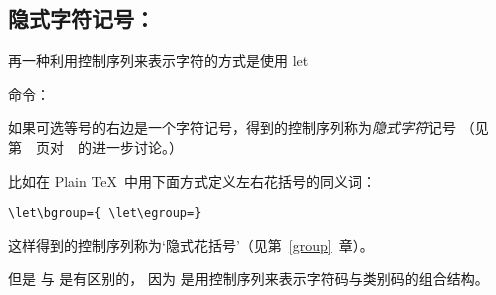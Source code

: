 \documentclass{book}
\begin{document}
\subsection{隐式字符记号：\protect{}}

再一种利用控制序列来表示字符的方式是使用 \cstoidx let\par{} 命令：
\begin{disp}\end{disp}
如果可选等号的右边是一个字符记号，得到的控制序列称为\emph{隐式字符}记号%
（见第~\pageref{let}~页对~~的进一步讨论。）

比如在 Plain \TeX\ 中用下面方式定义左右花括号的同义词：
\begin{verbatim}
\let\bgroup={ \let\egroup=}
\end{verbatim}
这样得到的控制序列称为`隐式花括号'（见第~\ref{group}~章）。

但是  与  是有区别的，
因为  是用控制序列来表示字符码与类别码的组合结构。
\end{document}
